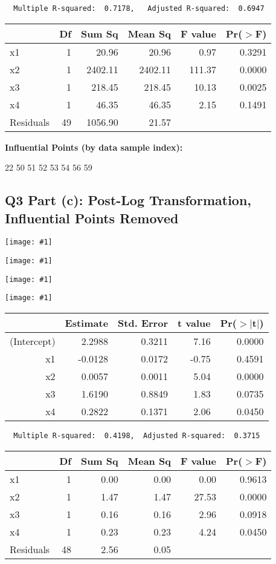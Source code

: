 \documentclass{article}
\newcommand\ssc[2][\DefaultOpt]{%
  \def\DefaultOpt{#2}%
  \subsection[#1]{#2}%
}
\newcommand{\simg}[1]{
  \texttt{[image: \#1]}
}
\begin{document}
{{\begin{verbatim}
  Multiple R-squared:  0.7178,	 Adjusted R-squared:  0.6947
\end{verbatim}

\begin{table}[ht]
\centering
\begin{tabular}{lrrrrr}
  \hline
 & Df & Sum Sq & Mean Sq & F value & Pr($>$F) \\ 
  \hline
x1 & 1 & 20.96 & 20.96 & 0.97 & 0.3291 \\ 
  x2 & 1 & 2402.11 & 2402.11 & 111.37 & 0.0000 \\ 
  x3 & 1 & 218.45 & 218.45 & 10.13 & 0.0025 \\ 
  x4 & 1 & 46.35 & 46.35 & 2.15 & 0.1491 \\ 
  Residuals & 49 & 1056.90 & 21.57 &  &  \\ 
   \hline
\end{tabular}
\end{table}

\textbf{Influential Points (by data sample index):}

22 50 51 52 53 54 56 59
}

\newpage

\ssc{Q3 Part (c): Post-Log Transformation, Influential Points Removed}{

\simg{HW6Q3PCLogHist}
\simg{HW6Q3PCLogResFitted}

\simg{HW6Q3PCLogQQPlot}
\simg{HW6Q3PCLogResX4}

\begin{table}[ht]
\centering
\begin{tabular}{rrrrr}
  \hline
 & Estimate & Std. Error & t value & Pr($>$$|$t$|$) \\ 
  \hline
(Intercept) & 2.2988 & 0.3211 & 7.16 & 0.0000 \\ 
  x1 & -0.0128 & 0.0172 & -0.75 & 0.4591 \\ 
  x2 & 0.0057 & 0.0011 & 5.04 & 0.0000 \\ 
  x3 & 1.6190 & 0.8849 & 1.83 & 0.0735 \\ 
  x4 & 0.2822 & 0.1371 & 2.06 & 0.0450 \\ 
   \hline
\end{tabular}
\end{table}

\begin{verbatim}
  Multiple R-squared:  0.4198, 	Adjusted R-squared:  0.3715
\end{verbatim}

\begin{table}[ht]
\centering
\begin{tabular}{lrrrrr}
  \hline
 & Df & Sum Sq & Mean Sq & F value & Pr($>$F) \\ 
  \hline
x1 & 1 & 0.00 & 0.00 & 0.00 & 0.9613 \\ 
  x2 & 1 & 1.47 & 1.47 & 27.53 & 0.0000 \\ 
  x3 & 1 & 0.16 & 0.16 & 2.96 & 0.0918 \\ 
  x4 & 1 & 0.23 & 0.23 & 4.24 & 0.0450 \\ 
  Residuals & 48 & 2.56 & 0.05 &  &  \\ 
   \hline
\end{tabular}
\end{table}

}}
\end{document}
